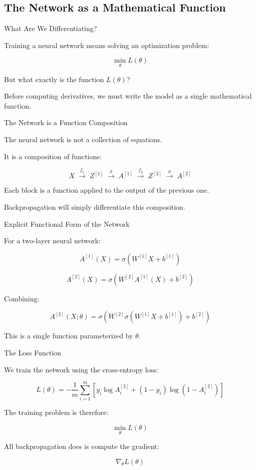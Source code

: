 \documentclass[aspectratio=169]{beamer}
\begin{document}
\subsection{The Network as a Mathematical Function}
%
\begin{frame}{What Are We Differentiating?}

Training a neural network means solving an optimization problem:

\[
\min_{\theta} L(\theta)
\]

But what exactly is the function \(L(\theta)\)?

Before computing derivatives, we must write the model as a single mathematical function.
\end{frame}
%
%
\begin{frame}{The Network is a Function Composition}

The neural network is not a collection of equations.

It is a composition of functions:

\[
X
\;\xrightarrow{\,f_1\,}\;
Z^{[1]}
\;\xrightarrow{\,\sigma\,}\;
A^{[1]}
\;\xrightarrow{\,f_2\,}\;
Z^{[2]}
\;\xrightarrow{\,\sigma\,}\;
A^{[2]}
\]

Each block is a function applied to the output of the previous one.

Backpropagation will simply differentiate this composition.
\end{frame}
%
%
\begin{frame}{Explicit Functional Form of the Network}

For a two-layer neural network:

\[
A^{[1]}(X) = \sigma(W^{[1]}X + b^{[1]})
\]

\[
A^{[2]}(X) = \sigma\!\left(W^{[2]}A^{[1]}(X) + b^{[2]}\right)
\]

Combining:

\[
A^{[2]}(X;\theta)
=
\sigma\!\left(
W^{[2]} \sigma(W^{[1]}X + b^{[1]}) + b^{[2]}
\right)
\]

This is a single function parameterized by \(\theta\).
\end{frame}
%
%
\begin{frame}{The Loss Function}

We train the network using the cross-entropy loss:

\[
L(\theta)
=
-\frac{1}{m}
\sum_{i=1}^{m}
\left[
y_i \log A^{[2]}_i
+
(1-y_i)\log(1-A^{[2]}_i)
\right]
\]

The training problem is therefore:

\[
\min_{\theta} L(\theta)
\]

All backpropagation does is compute the gradient:

\[
\nabla_{\theta} L(\theta)
\]
\end{frame}
%
\end{document}
